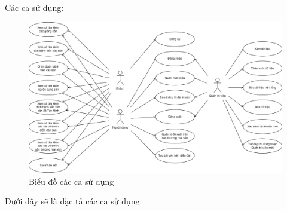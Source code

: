 \documentclass[./../main.tex]{subfiles}
\begin{document}
Các ca sử dụng:
\begin{figure}[H]
    \centering
    \includegraphics[width=\linewidth]{./img/uc-total.png}
    \caption{Biểu đồ các ca sử dụng}
\end{figure}

Dưới đây sẽ là đặc tả các ca sử dụng:
\end{document}
